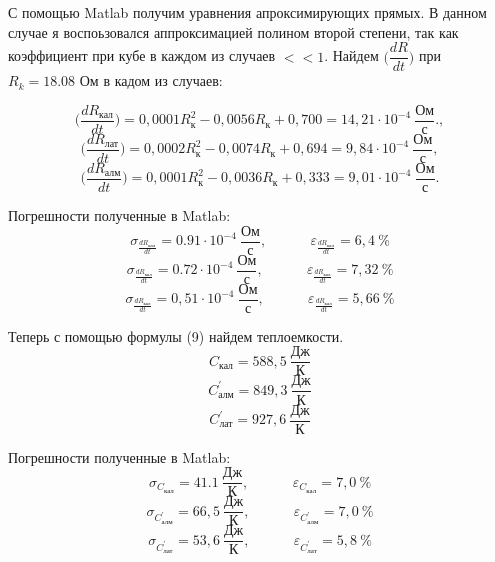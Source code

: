 С помощью Matlab получим уравнения апроксимирующих прямых. В данном случае я воспоьзовался аппроксимацией полином второй степени, так как коэффициент при кубе в каждом из случаев $<< 1$.
Найдем $\bigg(\dfrac{dR}{dt}\bigg)$ при $R_k = 18.08 $ Ом в кадом из случаев:	

\begin{equation}
	\bigg(\frac{dR_{\text{кал}}}{dt}\bigg) = 0,0001R_{\text{к}}^2 - 0,0056R_{\text{к}} + 0,700 = 14,21 \cdot 10^{-4}~ \dfrac{\text{Ом}}{\text{с}}.,
\end{equation}
\begin{equation}
	\bigg(\frac{dR_{\text{лат}}}{dt}\bigg) = 0,0002R_{\text{к}}^2 - 0,0074R_{\text{к}} + 0,694 = 9,84 \cdot 10^{-4}~ \dfrac{\text{Ом}}{\text{с}} ,
\end{equation}
\begin{equation}
	\bigg(\frac{dR_{\text{алм}}}{dt}\bigg) = 0,0001R_{\text{к}}^2 - 0,0036R_{\text{к}} + 0,333 = 9,01 \cdot 10^{-4}~ \dfrac{\text{Ом}}{\text{с}}.
\end{equation}

Погрешности полученные в Matlab:
\begin{equation}
\sigma_{\frac{dR_{\text{кал}}}{dt}} = 0.91 \cdot 10^{-4}\ \frac{\text{Ом}}{\text{с}}, ~~~~~~~~~~~~~~
\varepsilon_{\frac{dR_{\text{кал}}}{dt}} = 6,4\ \%
\end{equation}
\begin{equation}
\sigma_{\frac{dR_{\text{кал}}}{dt}} = 0.72 \cdot 10^{-4}\ \frac{\text{Ом}}{\text{с}}, ~~~~~~~~~~~~~~
\varepsilon_{\frac{dR_{\text{кал}}}{dt}} = 7,32\ \%
\end{equation}
\begin{equation}
\sigma_{\frac{dR_{\text{кал}}}{dt}} = 0,51 \cdot 10^{-4}\ \frac{\text{Ом}}{\text{с}}, ~~~~~~~~~~~~~~
\varepsilon_{\frac{dR_{\text{кал}}}{dt}} = 5,66\ \%
\end{equation}

Теперь с помощью формулы (9) найдем теплоемкости.
\begin{equation}
	C_{\text{кал}} = 588,5\ \frac{\text{Дж}}{\text{К}}
\end{equation}
\begin{equation}
	C^{'}_{\text{алм}} = 849,3\ \frac{\text{Дж}}{\text{К}}
\end{equation}
\begin{equation}
	C^{'}_{\text{лат}} = 927,6\ \frac{\text{Дж}}{\text{К}}
\end{equation}

Погрешности полученные в Matlab:
\begin{equation}
\sigma_{C_{\text{кал}}} = 41.1\ \frac{\text{Дж}}{\text{К}}, ~~~~~~~~~~~~~~
\varepsilon_{C_{\text{кал}}} = 7,0\ \%
\end{equation}
\begin{equation}
\sigma_{C^{'}_{\text{алм}}} = 66,5\ \frac{\text{Дж}}{\text{К}}, ~~~~~~~~~~~~~~
\varepsilon_{C^{'}_{\text{алм}}} = 7,0\ \%
\end{equation}
\begin{equation}
\sigma_{C^{'}_{\text{лат}}} = 53,6\ \frac{\text{Дж}}{\text{К}}, ~~~~~~~~~~~~~~
\varepsilon_{C^{'}_{\text{лат}}} = 5,8\ \%
\end{equation}

